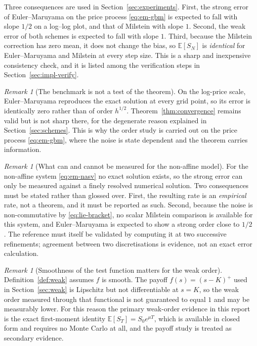 \documentclass[11pt,a4paper]{article}
\theoremstyle{definition}
\theoremstyle{remark}
\newtheorem{remark}[theorem]{Remark}
\begin{document}
Three consequences are used in Section~\ref{sec:experiments}. First, the strong error of Euler--Maruyama on the price process \eqref{eq:em-gbm} is expected to fall with slope $1/2$ on a log--log plot, and that of Milstein with slope $1$. Second, the weak error of both schemes is expected to fall with slope $1$. Third, because the Milstein correction has zero mean, it does not change the bias, so $\mathbb{E}[S_N]$ is \emph{identical} for Euler--Maruyama and Milstein at every step size. This is a sharp and inexpensive consistency check, and it is listed among the verification steps in Section~\ref{sec:impl-verify}.

\begin{remark}[The benchmark is not a test of the theorem]
\label{rem:exact-on-log}
On the log-price scale, Euler--Maruyama reproduces the exact solution at every grid point, so its error is identically zero rather than of order $h^{1/2}$. Theorem~\ref{thm:convergence} remains valid but is not sharp there, for the degenerate reason explained in Section~\ref{sec:schemes}. This is why the order study is carried out on the price process \eqref{eq:em-gbm}, where the noise is state dependent and the theorem carries information.
\end{remark}

\begin{remark}[What can and cannot be measured for the non-affine model]
\label{rem:empirical}
For the non-affine system \eqref{eq:em-nasv} no exact solution exists, so the strong error can only be measured against a finely resolved numerical solution. Two consequences must be stated rather than glossed over. First, the resulting rate is an \emph{empirical} rate, not a theorem, and it must be reported as such. Second, because the noise is non-commutative by \eqref{eq:lie-bracket}, no scalar Milstein comparison is available for this system, and Euler--Maruyama is expected to show a strong order close to $1/2$. The reference must itself be validated by computing it at two successive refinements; agreement between two discretisations is evidence, not an exact error calculation.
\end{remark}

\begin{remark}[Smoothness of the test function matters for the weak order]
\label{rem:weak-smoothness}
Definition~\ref{def:weak} assumes $f$ is smooth. The payoff $f(s) = (s - K)^+$ used in Section~\ref{sec:weak} is Lipschitz but not differentiable at $s = K$, so the weak order measured through that functional is not guaranteed to equal $1$ and may be measurably lower. For this reason the primary weak-order evidence in this report is the exact first-moment identity $\mathbb{E}[S_T] = S_0 e^{\mu T}$, which is available in closed form and requires no Monte Carlo at all, and the payoff study is treated as secondary evidence.
\end{remark}
\end{document}
